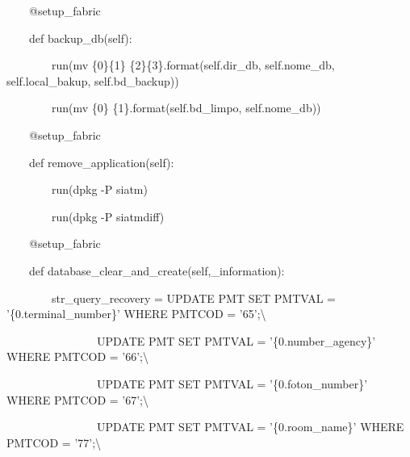     \bigskip

{\ttfamily\color[rgb]{0.10980392,0.10980392,0.10980392}
    \ \ \ \ @setup\_fabric}

{\ttfamily\color[rgb]{0.10980392,0.10980392,0.10980392}
    \ \ \ \ def backup\_db(self):}

{\ttfamily\color[rgb]{0.10980392,0.10980392,0.10980392}
    \ \ \ \ \ \ \ \ run({\textquotedbl}mv \{0\}\{1\} \{2\}\{3\}{\textquotedbl}.format(self.dir\_db, self.nome\_db,
                self.local\_bakup, self.bd\_backup))}

{\ttfamily\color[rgb]{0.10980392,0.10980392,0.10980392}
    \ \ \ \ \ \ \ \ run({\textquotedbl}mv \{0\} \{1\}{\textquotedbl}.format(self.bd\_limpo, self.nome\_db))}


    \bigskip

{\ttfamily\color[rgb]{0.10980392,0.10980392,0.10980392}
    \ \ \ \ @setup\_fabric}

{\ttfamily\color[rgb]{0.10980392,0.10980392,0.10980392}
    \ \ \ \ def remove\_application(self):}

{\ttfamily\color[rgb]{0.10980392,0.10980392,0.10980392}
    \ \ \ \ \ \ \ \ run({\textquotedbl}dpkg -P siatm{\textquotedbl})}

{\ttfamily\color[rgb]{0.10980392,0.10980392,0.10980392}
    \ \ \ \ \ \ \ \ run({\textquotedbl}dpkg -P siatmdiff{\textquotedbl})}


    \bigskip

{\ttfamily\color[rgb]{0.10980392,0.10980392,0.10980392}
    \ \ \ \ @setup\_fabric}

{\ttfamily\color[rgb]{0.10980392,0.10980392,0.10980392}
    \ \ \ \ def database\_clear\_and\_create(self,\_information):}

{\ttfamily\color[rgb]{0.10980392,0.10980392,0.10980392}
    \ \ \ \ \ \ \ \ str\_query\_recovery = {\textquotedbl}{\textquotedbl}{\textquotedbl}UPDATE PMT SET PMTVAL =
        '\{0.terminal\_number\}' WHERE PMTCOD = '65';{\textbackslash}}

{\ttfamily\color[rgb]{0.10980392,0.10980392,0.10980392}
    \ \ \ \ \ \ \ \ \ \ \ \ \ \ \ \ UPDATE PMT SET PMTVAL = '\{0.number\_agency\}' WHERE PMTCOD = '66';{\textbackslash}}

{\ttfamily\color[rgb]{0.10980392,0.10980392,0.10980392}
    \ \ \ \ \ \ \ \ \ \ \ \ \ \ \ \ UPDATE PMT SET PMTVAL = '\{0.foton\_number\}' WHERE PMTCOD = '67';{\textbackslash}}

{\ttfamily\color[rgb]{0.10980392,0.10980392,0.10980392}
    \ \ \ \ \ \ \ \ \ \ \ \ \ \ \ \ UPDATE PMT SET PMTVAL = '\{0.room\_name\}' WHERE PMTCOD = '77';{\textbackslash}}

